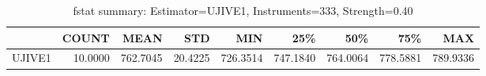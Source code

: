 \begin{table}[ht]
\centering
\caption{fstat summary: Estimator=UJIVE1, Instruments=333, Strength=0.40}
\begin{tabular}{lrrrrrrrr}
\toprule
 & COUNT & MEAN & STD & MIN & 25\% & 50\% & 75\% & MAX \\
\midrule
UJIVE1 & 10.0000 & 762.7045 & 20.4225 & 726.3514 & 747.1840 & 764.0064 & 778.5881 & 789.9336 \\
\bottomrule
\end{tabular}
\end{table}
